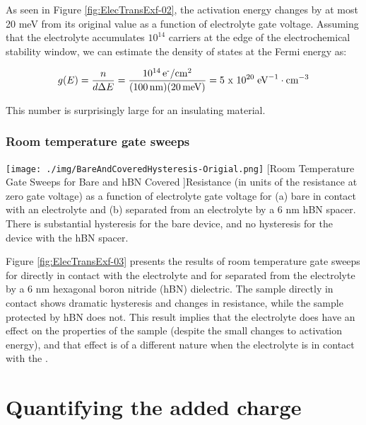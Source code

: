 As seen in Figure \ref{fig:ElecTransExf-02}, the activation energy changes by at most 20 meV from its original value as a function of electrolyte gate voltage. Assuming that the electrolyte accumulates $10^{14}$ \percmsq{} carriers at the edge of the electrochemical stability window, we can estimate the density of states at the Fermi energy as:

\begin{equation}
g(E) = \frac{n}{d \Delta E} = \frac{10^{14}\, \text{e\textsuperscript{-}/cm\textsuperscript{2}}}{(100\, \text{nm})(20\, \text{meV})} = \text{5 x 10}^{20}\; \text{eV}^{-1} \cdot \text{cm}^{-3}
\end{equation}

This number is surprisingly large for an insulating material.

\subsubsection{Room temperature gate sweeps}

\begin{centering}
\texttt{[image: ./img/BareAndCoveredHysteresis-Origial.png]}
  \captionsetup{width=0.75\textwidth}
  [Room Temperature Gate Sweeps for Bare and hBN Covered \rucl]{Resistance (in units of the resistance at zero gate voltage) as a function of electrolyte gate voltage for (a) bare \rucl in contact with an electrolyte and (b) \rucl separated from an electrolyte by a 6 nm hBN spacer. There is substantial hysteresis for the bare device, and no hysteresis for the device with the hBN spacer.} 
  \label{fig:ElecTransExf-03}
\end{centering}

Figure \ref{fig:ElecTransExf-03} presents the results of room temperature gate sweeps for \rucl directly in contact with the electrolyte and for \rucl separated from the electrolyte by a 6 nm hexagonal boron nitride (hBN) dielectric. The sample directly in contact shows dramatic hysteresis and changes in resistance, while the sample protected by hBN does not. This result implies that the electrolyte does have an effect on the properties of the sample (despite the small changes to activation energy), and that effect is of a different nature when the electrolyte is in contact with the \ruclnospace .

\section{Quantifying the added charge}

